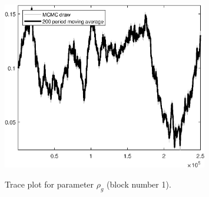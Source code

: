 \begin{figure}[H]
\centering
  \includegraphics[width=0.8\textwidth]{BRS_aggregate/graphs/TracePlot_rho_g_blck_1}\\
    \caption{Trace plot for parameter ${\rho_g}$ (block number 1).}
\end{figure}
